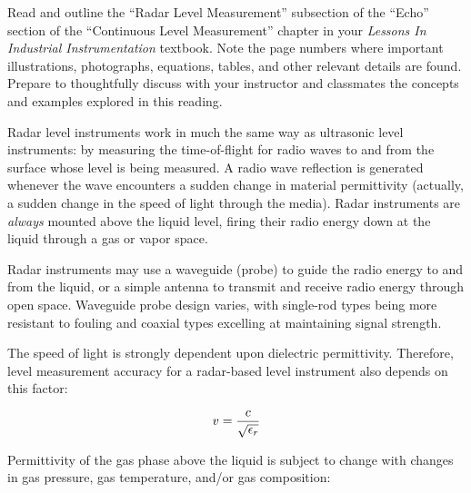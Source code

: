 

Read and outline the ``Radar Level Measurement'' subsection of the ``Echo'' section of the ``Continuous Level Measurement'' chapter in your {\it Lessons In Industrial Instrumentation} textbook.  Note the page numbers where important illustrations, photographs, equations, tables, and other relevant details are found.  Prepare to thoughtfully discuss with your instructor and classmates the concepts and examples explored in this reading.














Radar level instruments work in much the same way as ultrasonic level instruments: by measuring the time-of-flight for radio waves to and from the surface whose level is being measured.  A radio wave reflection is generated whenever the wave encounters a sudden change in material permittivity (actually, a sudden change in the speed of light through the media).  Radar instruments are {\it always} mounted above the liquid level, firing their radio energy down at the liquid through a gas or vapor space.

\vskip 10pt

Radar instruments may use a waveguide (probe) to guide the radio energy to and from the liquid, or a simple antenna to transmit and receive radio energy through open space.  Waveguide probe design varies, with single-rod types being more resistant to fouling and coaxial types excelling at maintaining signal strength.

\vskip 10pt

The speed of light is strongly dependent upon dielectric permittivity.  Therefore, level measurement accuracy for a radar-based level instrument also depends on this factor:

$$v = {c \over \sqrt{\epsilon_r}}$$

Permittivity of the gas phase above the liquid is subject to change with changes in gas pressure, gas temperature, and/or gas composition: 

